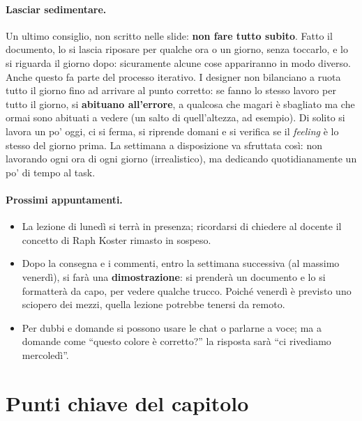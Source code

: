 \paragraph{Lasciar sedimentare.} Un ultimo consiglio, non scritto nelle
slide: \textbf{non fare tutto subito}. Fatto il documento, lo si lascia
riposare per qualche ora o un giorno, senza toccarlo, e lo si riguarda il
giorno dopo: sicuramente alcune cose appariranno in modo diverso. Anche questo
fa parte del processo iterativo. I designer non bilanciano a ruota tutto il
giorno fino ad arrivare al punto corretto: se fanno lo stesso lavoro per tutto
il giorno, si \textbf{abituano all'errore}, a qualcosa che magari è sbagliato
ma che ormai sono abituati a vedere (un salto di quell'altezza, ad esempio).
Di solito si lavora un po' oggi, ci si ferma, si riprende domani e si verifica
se il \emph{feeling} è lo stesso del giorno prima. La settimana a disposizione
va sfruttata così: non lavorando ogni ora di ogni giorno (irrealistico), ma
dedicando quotidianamente un po' di tempo al task.

\paragraph{Prossimi appuntamenti.}
\begin{itemize}
  \item La lezione di lunedì si terrà in presenza; ricordarsi di chiedere al
        docente il concetto di Raph Koster rimasto in sospeso.
  \item Dopo la consegna e i commenti, entro la settimana successiva
        (al massimo venerdì), si farà una \textbf{dimostrazione}: si prenderà
        un documento e lo si formatterà da capo, per vedere qualche trucco.
        Poiché venerdì è previsto uno sciopero dei mezzi, quella lezione
        potrebbe tenersi da remoto.
  \item Per dubbi e domande si possono usare le chat o parlarne a voce; ma a
        domande come ``questo colore è corretto?'' la risposta sarà ``ci
        rivediamo mercoledì''.
\end{itemize}

\section*{Punti chiave del capitolo}


